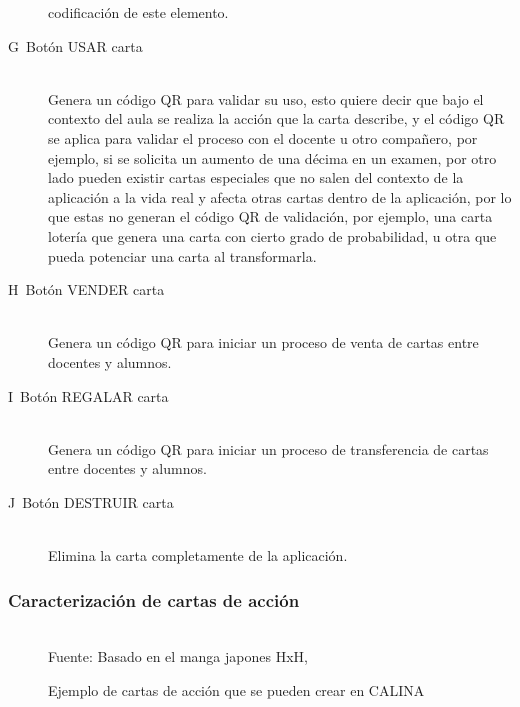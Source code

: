 \begin{description}
	codificación de este elemento.
  \item[\textlangle G\textrangle\ Botón USAR carta] \hfill \\ Genera un código QR para validar su uso, esto 
	quiere decir que bajo el contexto del aula se realiza la acción que la carta describe, y el código QR 
	se aplica para validar el proceso con el docente u otro compañero, por ejemplo, si se solicita un 
	aumento de una décima en un examen, por otro lado pueden existir cartas especiales que no salen del 
	contexto de la aplicación a la vida real y afecta otras cartas dentro de la aplicación, por lo que 
	estas no generan el código QR de validación, por ejemplo, una carta lotería que genera una carta con 
	cierto grado de probabilidad, u otra que pueda potenciar una carta al transformarla.
  \item[\textlangle H\textrangle\ Botón VENDER carta] \hfill \\ Genera un código QR para iniciar un proceso de 
	venta de cartas entre docentes y alumnos.
  \item[\textlangle I\textrangle\ Botón REGALAR carta] \hfill \\ Genera un código QR para iniciar un proceso 
	de transferencia de cartas entre docentes y alumnos.
  \item[\textlangle J\textrangle\ Botón DESTRUIR carta] \hfill \\ Elimina la carta completamente de la 
	aplicación.
\end{description}

\subsubsection{Caracterización de cartas de acción}

\begin{figure}[!htb]
\caption{Ejemplo de cartas de acción que se pueden crear en CALINA}
\label{img:modelodecartasaccion}
\centering
\begin{adjustbox}{width=12cm}
\end{adjustbox}
\\
{\footnotesize Fuente: Basado en el manga japones HxH, }
\end{figure}

